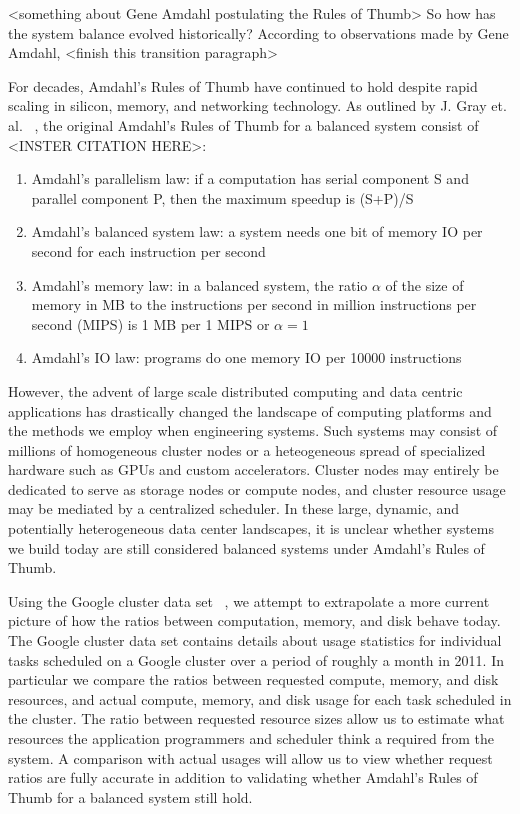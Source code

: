 \documentclass{sig-alternate}
\begin{document}

<something about Gene Amdahl postulating the Rules of Thumb>
So how has the system balance evolved historically?
According to observations made by Gene Amdahl,
<finish this transition paragraph>

For decades, Amdahl's Rules of Thumb have continued to hold despite rapid scaling in silicon, memory, and networking technology.
As outlined by J. Gray et. al. ~\cite{export:68636}, the original Amdahl's Rules of Thumb for a balanced system consist of <INSTER CITATION HERE>:
\begin{enumerate}
\item Amdahl's parallelism law: if a computation has serial component S and parallel component P, then the maximum speedup is (S+P)/S
\item Amdahl's balanced system law: a system needs one bit of memory IO per second for each instruction per second
\item Amdahl's memory law: in a balanced system, the ratio $\alpha$ of the size of memory in MB to the instructions per second in million instructions per second (MIPS) is 1 MB per 1 MIPS or $\alpha = 1$
\item Amdahl's IO law: programs do one memory IO per 10000 instructions
\end{enumerate}
However, the advent of large scale distributed computing and data centric applications has drastically changed the landscape of computing platforms and the methods we employ when engineering systems.
Such systems may consist of millions of homogeneous cluster nodes or a heteogeneous spread of specialized hardware such as GPUs and custom accelerators.
Cluster nodes may entirely be dedicated to serve as storage nodes or compute nodes, and cluster resource usage may be mediated by a centralized scheduler.
In these large, dynamic, and potentially heterogeneous data center landscapes, it is unclear whether systems we build today are still considered balanced systems under Amdahl's Rules of Thumb.

Using the Google cluster data set ~\cite{clusterdata:Wilkes2011, clusterdata:Reiss2011}, we attempt to extrapolate a more current picture of how the ratios between computation, memory, and disk behave today.
The Google cluster data set contains details about usage statistics for individual tasks scheduled on a Google cluster over a period of roughly a month in 2011.
In particular we compare the ratios between requested compute, memory, and disk resources, and actual compute, memory, and disk usage for each task scheduled in the cluster.
The ratio between requested resource sizes allow us to estimate what resources the application programmers and scheduler think a required from the system.
A comparison with actual usages will allow us to view whether request ratios are fully accurate in addition to validating whether Amdahl's Rules of Thumb for a balanced system still hold.
\end{document}
